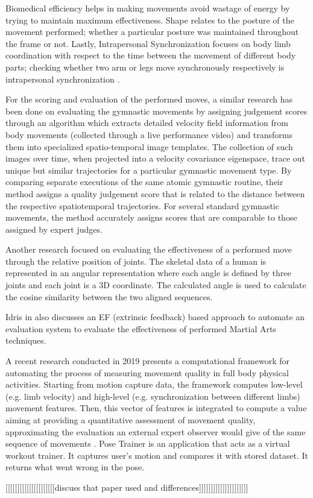 Biomedical efficiency helps in making movements avoid wastage of energy by trying to maintain maximum effectiveness. Shape relates to the posture of the movement performed; whether a particular posture was maintained throughout the frame or not. Lastly, Intrapersonal Synchronization focuses on body limb coordination with respect to the time between the movement of different body parts; checking whether two arm or legs move synchronously respectively is intrapersonal synchronization \cite{movementQuality}. 


For the scoring and evaluation of the performed moves, a similar research has been done on evaluating the gymnastic movements by assigning judgement scores through an algorithm which extracts detailed velocity field information from body movements (collected through a live performance video) and transforms them into specialized spatio-temporal image templates. The collection of such images over time, when projected into a velocity covariance eigenspace, trace out unique but similar trajectories for a particular gymnastic movement type. By comparing separate executions of the same atomic gymnastic routine, their method assigns a quality judgement score that is related to the distance between the respective spatiotemporal trajectories. For several standard gymnastic movements, the method accurately assigns scores that are comparable to those assigned by expert judges. \cite{gymnastic}
 

Another research focused on evaluating the effectiveness of a performed move through the relative position of joints. The skeletal data of a human is represented in an angular representation where each angle is defined by three joints and each joint is a 3D coordinate. The calculated angle is used to calculate the cosine similarity between the two aligned sequences. \cite{Karate}


Idris in \cite{Idris} also discusses an EF (extrinsic feedback) based approach to automate an evaluation system to evaluate the effectiveness of performed Martial Arts techniques.
 

A recent research conducted in 2019 presents a computational framework for automating the process of measuring movement quality in full body physical activities. Starting from motion capture data, the framework computes low-level (e.g. limb velocity) and high-level (e.g. synchronization between different limbs) movement features. Then, this vector of features is integrated to compute a value aiming at providing a quantitative assessment of movement quality, approximating the evaluation an external expert observer would give of the same sequence of movements \cite{movementQuality}. Pose Trainer \cite{poseCorrect} is an application that acts as a virtual workout trainer. It captures user's motion and compares it with stored dataset. It returns what went wrong in the pose. 

[[[[[[[[[[[[[[[[[[[[[discuss that paper used and differences]]]]]]]]]]]]]]]]]]]]]



